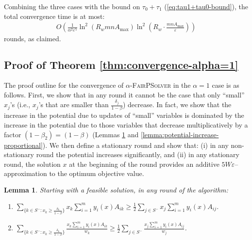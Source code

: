 \documentclass[11pt]{article}
\makeatletter
\newcommand{\wratio}{R_w}
\newtheorem{lemma}[theorem]{Lemma}
\newenvironment{proofof}[1]{\par
  \pushQED{\qed}\normalfont \topsep3\p@\relax
  \trivlist
  \item[\hskip\labelsep
        \bfseries
    Proof of #1\@addpunct{.}]\ignorespaces
}{\popQED\endtrivlist\@endpefalse
}
\makeatother
\begin{document}
\begin{proofof}{Theorem \ref{thm:convergence-alpha<1}}
Combining the three cases with the bound on $\tau_0+ \tau_1$ (\ref{eq:tau1+tau0-bound}), the total convergence time is at most:
\begin{align*}
O\left(\frac{1}{\alpha^2\varepsilon^5}\ln^2\left(\wratio{mnA_{\max}}\right)\ln^2\left(\wratio\cdot\frac{mnA_{\max}}{\varepsilon}\right)\right)
\end{align*}
rounds, as claimed.
\end{proofof}


\subsection{Proof of Theorem \ref{thm:convergence-alpha=1}}\label{section:alpha=1}

The proof outline for the convergence of \textsc{$\alpha$-FairPSolver} in the $\alpha = 1$ case is as follows. First, we show that in any round it cannot be the case that only ``small'' $x_j$'s (i.e., $x_j$'s that are smaller than $\frac{\delta_j}{1-\beta}$) decrease. In fact, we show that the increase in the potential due to updates of ``small'' variables is dominated by the increase in the potential due to those variables that decrease multiplicatively by a factor $(1-\beta_2) = (1-\beta)$ (Lemmas \ref{lemma:mul-increase-prop} and \ref{lemma:potential-increase-proportional}). We then define a stationary round and show that: (i) in any non-stationary round the potential increases significantly, and (ii) in any stationary round, the solution $x$ at the beginning of the round provides an additive $5W\varepsilon$--approximation to the optimum objective value.  


\begin{lemma}\label{lemma:mul-increase-prop}
Starting with a feasible solution, in any round of the algorithm: 
\begin{enumerate}
\item $\sum_{\{k\in S^- : x_k\geq \frac{\delta_k}{1-\beta}\}} x_k \sum_{i=1}^m y_i(x)A_{ik}\geq \frac{1}{2}\sum_{j\in S^-} x_j \sum_{i=1}^m y_i(x)A_{ij}$.
\item $\sum_{\{k\in S^- : x_k\geq \frac{\delta_k}{1-\beta}\}} \frac{x_k \sum_{i=1}^m y_i(x)A_{ik}}{w_k}\geq \frac{1}{2}\sum_{j\in S^-} \frac{x_j \sum_{i=1}^m y_i(x)A_{ij}}{w_j}$.
\end{enumerate}
\end{lemma}
\end{document}
